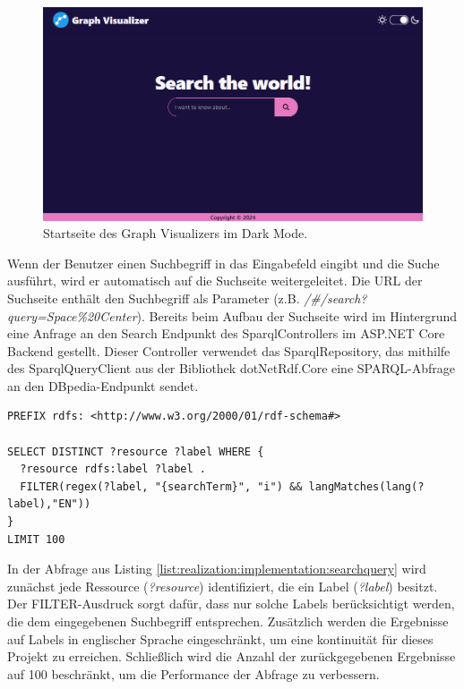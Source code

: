\begin{figure}[h]
    \centering
    \includegraphics[height=.5\textwidth]{images/03/HomePageDark.png}
    \caption{Startseite des Graph Visualizers im Dark Mode.}
    \label{fig:realization:implementation:homepagedark}
\end{figure}

Wenn der Benutzer einen Suchbegriff in das Eingabefeld eingibt und die Suche ausführt, wird er automatisch auf die Suchseite weitergeleitet. Die URL der Suchseite enthält den Suchbegriff als Parameter (z.B. \textit{/\#/search?query=Space\%20Center}). Bereits beim Aufbau der Suchseite wird im Hintergrund eine Anfrage an den Search Endpunkt des SparqlControllers im ASP.NET Core Backend gestellt. Dieser Controller verwendet das SparqlRepository, das mithilfe des SparqlQueryClient aus der Bibliothek dotNetRdf.Core eine SPARQL-Abfrage an den DBpedia-Endpunkt sendet.

\begin{lstlisting}[caption={SPARQL-Abfrage zur Filterung von Ressourcen anhand des Labels}, label={list:realization:implementation:searchquery}]
PREFIX rdfs: <http://www.w3.org/2000/01/rdf-schema#>

SELECT DISTINCT ?resource ?label WHERE {
  ?resource rdfs:label ?label .
  FILTER(regex(?label, "{searchTerm}", "i") && langMatches(lang(?label),"EN"))
}
LIMIT 100
\end{lstlisting}

In der Abfrage aus Listing \ref{list:realization:implementation:searchquery} wird zunächst jede Ressource (\textit{?resource}) identifiziert, die ein Label (\textit{?label}) besitzt. Der FILTER-Ausdruck sorgt dafür, dass nur solche Labels berücksichtigt werden, die dem eingegebenen Suchbegriff entsprechen. Zusätzlich werden die Ergebnisse auf Labels in englischer Sprache eingeschränkt, um eine kontinuität für dieses Projekt zu erreichen. Schließlich wird die Anzahl der zurückgegebenen Ergebnisse auf 100 beschränkt, um die Performance der Abfrage zu verbessern.

